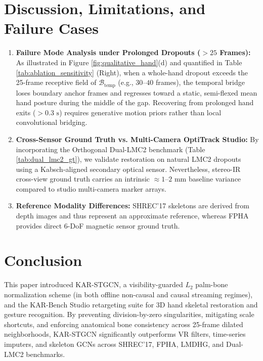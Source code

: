 \documentclass[10pt,twocolumn]{article}
\begin{document}
\section{Discussion, Limitations, and Failure Cases}
\begin{enumerate}
    \item \textbf{Failure Mode Analysis under Prolonged Dropouts ($>25$ Frames):} As illustrated in Figure \ref{fig:qualitative_hand}(d) and quantified in Table \ref{tab:ablation_sensitivity} (Right), when a whole-hand dropout exceeds the 25-frame receptive field of $\mathcal{B}_{\text{temp}}$ (e.g., $30\text{--}40$ frames), the temporal bridge loses boundary anchor frames and regresses toward a static, semi-flexed mean hand posture during the middle of the gap. Recovering from prolonged hand exits ($>0.3\text{ s}$) requires generative motion priors \cite{rastgoo2025deep} rather than local convolutional bridging.
    \item \textbf{Cross-Sensor Ground Truth vs. Multi-Camera OptiTrack Studio:} By incorporating the Orthogonal Dual-LMC2 benchmark \cite{gilmartin2024duallmc2} (Table \ref{tab:dual_lmc2_gt}), we validate restoration on natural LMC2 dropouts using a Kabsch-aligned secondary optical sensor. Nevertheless, stereo-IR cross-view ground truth carries an intrinsic $\approx 1\text{--}2\text{ mm}$ baseline variance compared to studio multi-camera marker arrays.
    \item \textbf{Reference Modality Differences:} SHREC'17 skeletons are derived from depth images \cite{de2017shrec} and thus represent an approximate reference, whereas FPHA \cite{garcia2018first} provides direct 6-DoF magnetic sensor ground truth.
\end{enumerate}

\section{Conclusion}
This paper introduced KAR-STGCN, a visibility-guarded $L_2$ palm-bone normalization scheme (in both offline non-causal and causal streaming regimes), and the KAR-Bench Studio retargeting suite for 3D hand skeletal restoration and gesture recognition. By preventing division-by-zero singularities, mitigating scale shortcuts, and enforcing anatomical bone consistency across 25-frame dilated neighborhoods, KAR-STGCN significantly outperforms VR filters, time-series imputers, and skeleton GCNs across SHREC'17, FPHA, LMDHG, and Dual-LMC2 benchmarks.
\end{document}
